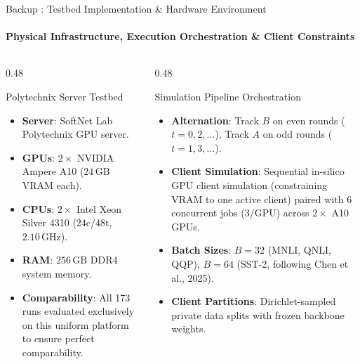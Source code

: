 \documentclass[aspectratio=169]{beamer}
\begin{document}
\begin{frame}[noframenumbering, label=backup_testbed]{Backup : Testbed Implementation \& Hardware Environment}
    \framesubtitle{Physical Infrastructure, Execution Orchestration \& Client Constraints \hfill \hyperlink{main_impl}{} \; \hyperlink{thank_you}{}}
    \footnotesize
    \begin{columns}[t]
        \begin{column}{0.48\textwidth}
            \begin{block}{Polytechnix Server Testbed}
                \begin{itemize}
                    \item \textbf{Server}: SoftNet Lab Polytechnix GPU server.
                    \item \textbf{GPUs}: $2\times$ NVIDIA Ampere A10 ($24\,\text{GB}$ VRAM each).
                    \item \textbf{CPUs}: $2\times$ Intel Xeon Silver 4310 ($24\text{c}/48\text{t}$, $2.10\,\text{GHz}$).
                    \item \textbf{RAM}: $256\,\text{GB}$ DDR4 system memory.
                    \item \textbf{Comparability}: All 173 runs evaluated exclusively on this uniform platform to ensure perfect comparability.
                \end{itemize}
            \end{block}
        \end{column}
        \begin{column}{0.48\textwidth}
            \begin{block}{Simulation Pipeline Orchestration}
                \begin{itemize}
                    \item \textbf{Alternation}: Track $B$ on even rounds ($t=0,2,\dots$), Track $A$ on odd rounds ($t=1,3,\dots$).
                    \item \textbf{Client Simulation}: Sequential in-silico GPU client simulation (constraining VRAM to one active client) paired with 6 concurrent jobs ($3$/GPU) across $2\times$ A10 GPUs.
                    \item \textbf{Batch Sizes}: $B = 32$ (MNLI, QNLI, QQP), $B = 64$ (SST-2, following Chen et al., 2025).
                    \item \textbf{Client Partitions}: Dirichlet-sampled private data splits with frozen backbone weights.
                \end{itemize}
            \end{block}
        \end{column}
    \end{columns}
\end{frame}
\end{document}
